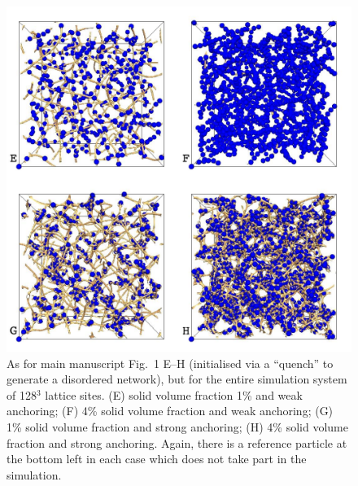 \documentclass[12pt,twoside]{article}
\begin{document}
\begin{figure}[t]
\begin{center}
\includegraphics[scale=0.35]{support-fig3.pdf}
\end{center}
\caption{As for main manuscript Fig.~1 E--H (initialised via a ``quench''
to generate a disordered network), but for the entire simulation
system of 128$^3$ lattice sites. (E) solid volume fraction 1\% and
weak anchoring; (F) 4\% solid volume fraction and weak anchoring;
(G) 1\% solid volume fraction and strong anchoring; (H) 4\% solid
volume fraction and strong anchoring. Again, there is a reference
particle at the bottom left in each case which does not take part
in the simulation.}
\end{figure}
\end{document}
